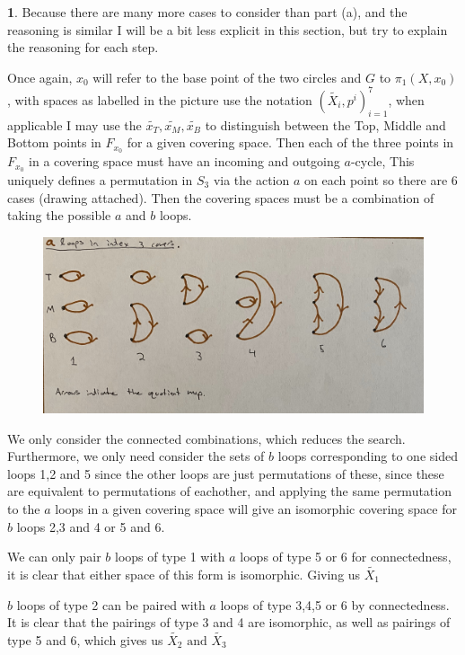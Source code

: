 \documentclass[10.5pt]{article}
\theoremstyle{definition}
\newtheorem{pb}{}
\newcommand{\tand}{\text{ and }}
\begin{document}
\begin{pb}
        Because there are many more cases to consider than part (a), and the reasoning is similar I will be a bit less explicit in this section, but try to explain the reasoning for each step.

        Once again, \(x_0\) will refer to the base point of the two circles and \(G\) to \(\pi_1(X,x_0)\), with spaces as labelled in the picture use the notation \((\tilde{X_i},p^i)_{i=1}^7\), when applicable I may use the \(\tilde{x_T},\tilde{x_M},\tilde{x_B}\) to distinguish between the Top, Middle and Bottom points in \(F_{x_0}\) for a given covering space. Then each of the three points in \(F_{x_0}\) in a covering space must have an incoming and outgoing \(a\)-cycle, This uniquely defines a permutation in \(S_3\) via the action \(a\) on each point so there are 6 cases (drawing attached). Then the covering spaces must be a combination of taking the possible \(a\) and \(b\) loops.

        \begin{figure}[h]
            \centering
            \includegraphics[width = \textwidth]{graphics/One sided loops.jpg}
        \end{figure}

        We only consider the connected combinations, which reduces the search. Furthermore, we only need consider the sets of \(b\) loops corresponding to one sided loops 1,2 and 5 since the other loops are just permutations of these, since these are equivalent to permutations of eachother, and applying the same permutation to the \(a\) loops in a given covering space will give an isomorphic covering space for \(b\) loops 2,3 and 4 or 5 and 6.
        
        We can only pair \(b\) loops of type 1 with \(a\) loops of type 5 or 6 for connectedness, it is clear that either space of this form is isomorphic. Giving us \(\tilde{X_1}\)

        \(b\) loops of type 2 can be paired with \(a\) loops of type 3,4,5 or 6 by connectedness. It is clear that the pairings of type 3 and 4 are isomorphic, as well as pairings of type 5 and 6, which gives us \(\tilde{X_2} \tand \tilde{X_3}\)


\end{pb}
\end{document}
